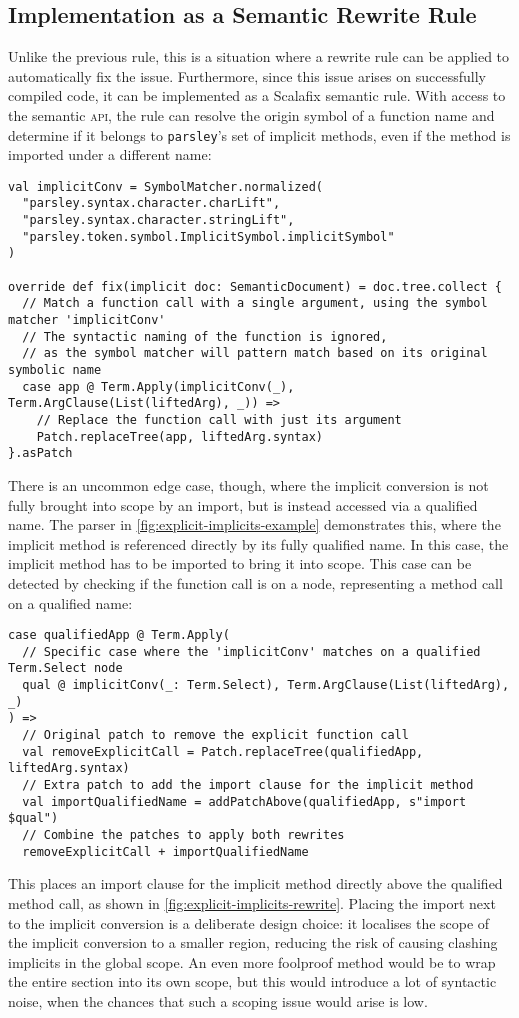 \documentclass[../../main.tex]{subfiles}
\begin{document}
\subsection{Implementation as a Semantic Rewrite Rule}
Unlike the previous rule, this is a situation where a rewrite rule can be applied to automatically fix the issue.
Furthermore, since this issue arises on successfully compiled code, it can be implemented as a Scalafix semantic rule.
With access to the semantic \textsc{api}, the rule can resolve the origin symbol of a function name and determine if it belongs to \texttt{parsley}'s set of implicit methods, even if the method is imported under a different name:
\begin{verbatim}
val implicitConv = SymbolMatcher.normalized(
  "parsley.syntax.character.charLift",
  "parsley.syntax.character.stringLift",
  "parsley.token.symbol.ImplicitSymbol.implicitSymbol"
)

override def fix(implicit doc: SemanticDocument) = doc.tree.collect {
  // Match a function call with a single argument, using the symbol matcher 'implicitConv'
  // The syntactic naming of the function is ignored,
  // as the symbol matcher will pattern match based on its original symbolic name
  case app @ Term.Apply(implicitConv(_), Term.ArgClause(List(liftedArg), _)) =>
    // Replace the function call with just its argument
    Patch.replaceTree(app, liftedArg.syntax)
}.asPatch
\end{verbatim}
%
There is an uncommon edge case, though, where the implicit conversion is not fully brought into scope by an import, but is instead accessed via a qualified name.
The  parser in \cref{fig:explicit-implicits-example} demonstrates this, where the  implicit method is referenced directly by its fully qualified name.
In this case, the implicit method has to be imported to bring it into scope.
This case can be detected by checking if the function call is on a  node, representing a method call on a qualified name:
\begin{verbatim}
case qualifiedApp @ Term.Apply(
  // Specific case where the 'implicitConv' matches on a qualified Term.Select node
  qual @ implicitConv(_: Term.Select), Term.ArgClause(List(liftedArg), _)
) =>
  // Original patch to remove the explicit function call
  val removeExplicitCall = Patch.replaceTree(qualifiedApp, liftedArg.syntax)
  // Extra patch to add the import clause for the implicit method
  val importQualifiedName = addPatchAbove(qualifiedApp, s"import $qual")
  // Combine the patches to apply both rewrites
  removeExplicitCall + importQualifiedName
\end{verbatim}
%
This places an import clause for the implicit method directly above the qualified method call, as shown in \cref{fig:explicit-implicits-rewrite}.
Placing the import next to the implicit conversion is a deliberate design choice: it localises the scope of the implicit conversion to a smaller region, reducing the risk of causing clashing implicits in the global scope.
An even more foolproof method would be to wrap the entire section into its own scope, but this would introduce a lot of syntactic noise, when the chances that such a scoping issue would arise is low.
\end{document}
